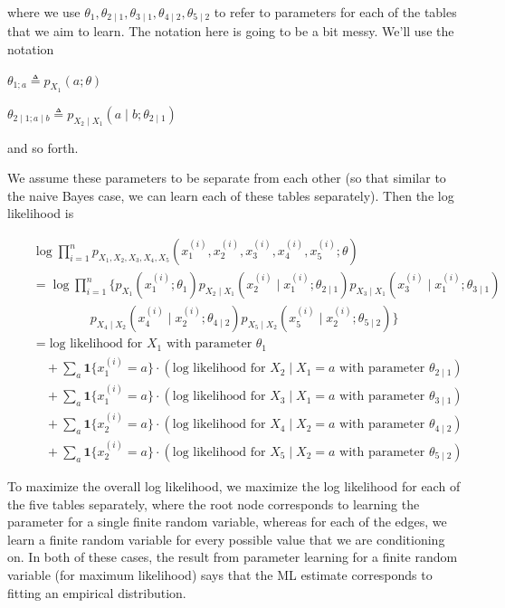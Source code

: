where we use $\theta _{1},\theta _{2\mid 1},\theta _{3\mid 1},\theta _{4\mid 2},\theta _{5\mid 2}$ to refer to parameters for each of the tables that we aim to learn. The notation here is going to be a bit messy. We'll use the notation

{\centering$\theta _{1;a}\triangleq p_{X_{1}}(a;\theta )$ \par}
 
{\centering$\theta _{2\mid 1;a\mid b}\triangleq p_{X_{2}\mid X_{1}}(a\mid b;\theta _{2\mid 1})$ \par}
 
and so forth.

We assume these parameters to be separate from each other (so that similar to the naive Bayes case, we can learn each of these tables separately). Then the log likelihood is

\begin{eqnarray*}
 &  & \log\prod_{i=1}^{n}p_{X_{1},X_{2},X_{3},X_{4},X_{5}}(x_{1}^{(i)},x_{2}^{(i)},x_{3}^{(i)},x_{4}^{(i)},x_{5}^{(i)};\theta)\\
 &  & =\log\prod_{i=1}^{n}\big\{ p_{X_{1}}(x_{1}^{(i)};\theta_{1})p_{X_{2}\mid X_{1}}(x_{2}^{(i)}\mid x_{1}^{(i)};\theta_{2\mid1})p_{X_{3}\mid X_{1}}(x_{3}^{(i)}\mid x_{1}^{(i)};\theta_{3\mid1}) \\
 &  & \qquad\qquad\;\; p_{X_{4}\mid X_{2}}(x_{4}^{(i)}\mid x_{2}^{(i)};\theta_{4\mid2})p_{X_{5}\mid X_{2}}(x_{5}^{(i)}\mid x_{2}^{(i)};\theta_{5\mid2})\big\}\\
 &  & =\text{log likelihood for }X_{1}\text{ with parameter }\theta_{1}\\
 &  & \quad+\sum_{a}\mathbf{1}\{x_{1}^{(i)}=a\}\cdot(\text{log likelihood for }X_{2}\mid X_{1}=a\text{ with parameter }\theta_{2\mid1})\\
 &  & \quad+\sum_{a}\mathbf{1}\{x_{1}^{(i)}=a\}\cdot(\text{log likelihood for }X_{3}\mid X_{1}=a\text{ with parameter }\theta_{3\mid1})\\
 &  & \quad+\sum_{a}\mathbf{1}\{x_{2}^{(i)}=a\}\cdot(\text{log likelihood for }X_{4}\mid X_{2}=a\text{ with parameter }\theta_{4\mid2})\\
 &  & \quad+\sum_{a}\mathbf{1}\{x_{2}^{(i)}=a\}\cdot(\text{log likelihood for }X_{5}\mid X_{2}=a\text{ with parameter }\theta_{5\mid2})
\end{eqnarray*}

To maximize the overall log likelihood, we maximize the log likelihood for each of the five tables separately, where the root node corresponds to learning the parameter for a single finite random variable, whereas for each of the edges, we learn a finite random variable for every possible value that we are conditioning on. In both of these cases, the result from parameter learning for a finite random variable (for maximum likelihood) says that the ML estimate corresponds to fitting an empirical distribution.

